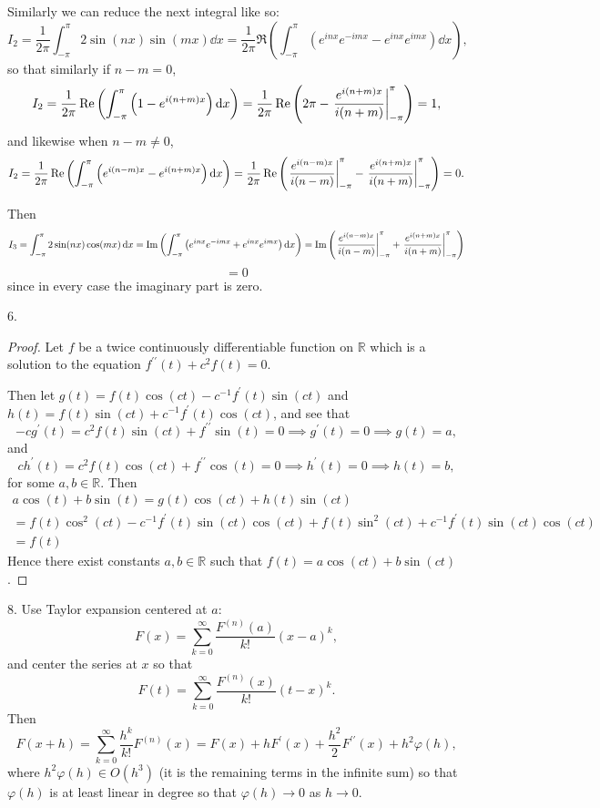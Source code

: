 \documentclass[11pt]{article}
\newcommand{\br}[1]{\left(#1\right)}
\begin{document}
Similarly we can reduce the next integral like so: \[I_2 = \frac{1}{2\pi}\int_{-\pi}^{\pi}2\sin(nx)\sin(mx)\dd{x} = \frac{1}{2\pi}\Re\br{\int_{-\pi}^{\pi}\br{e^{inx}e^{-imx} - e^{inx}e^{imx}}\dd{x}},\] so that similarly if $n-m = 0$, \[I_2 = \frac{1}{2\pi}\Re\br{\int_{-\pi}^{\pi}\br{1 - e^{i(n+m)x}}\dd{x}} = \frac{1}{2\pi}\Re\br{2\pi - \eval{\frac{e^{i(n+m)x}}{i(n+m)}}_{-\pi}^{\pi}} = 1,\] and likewise when $n-m\neq 0$, \[I_2 = \frac{1}{2\pi}\Re\br{\int_{-\pi}^{\pi}\br{e^{i(n-m)x} - e^{i(n+m)x}}\dd{x}} = \frac{1}{2\pi}\Re\br{\eval{\frac{e^{i(n-m)x}}{i(n-m)}}_{-\pi}^{\pi} - \eval{\frac{e^{i(n+m)x}}{i(n+m)}}_{-\pi}^{\pi}} = 0.\] 

Then \[I_3 = \int_{-\pi}^{\pi}2\sin(nx)\cos(mx)\dd{x} = \Im\br{\int_{-\pi}^{\pi}\br{e^{inx}e^{-imx} + e^{inx}e^{imx}}\dd{x}} = \Im\br{\eval{\frac{e^{i(n-m)x}}{i(n-m)}}_{-\pi}^{\pi} + \eval{\frac{e^{i(n+m)x}}{i(n+m)}}_{-\pi}^{\pi}}\] \[= 0\] since in every case the imaginary part is zero.

6. \begin{proof}
  Let $f$ be a twice continuously differentiable function on $\mathbb{R}$ which is a solution to the equation $f^{\prime \prime}(t)+ c^2f(t) = 0$.

  Then let $g(t) = f(t)\cos(ct) - c^{-1}f^{\prime}(t)\sin(ct)$ and $h(t) = f(t)\sin(ct) + c^{-1}f^{\prime}(t)\cos(ct)$, and see that \[-cg^{\prime}(t) = c^2f(t)\sin(ct) + f^{\prime \prime}\sin(t) = 0 \implies g^{\prime}(t) = 0 \implies g(t) = a,\] and \[ch^{\prime}(t) = c^2f(t)\cos(ct) + f^{\prime \prime}\cos(t) = 0 \implies h^{\prime}(t) = 0 \implies h(t) = b,\] for some  $a,b\in \mathbb{R}$. Then \begin{multline*}a\cos(t) + b\sin(t) = g(t)\cos(ct) + h(t)\sin(ct)\\ = f(t)\cos^2(ct) - c^{-1}f^{\prime}(t)\sin(ct)\cos(ct) + f(t)\sin^2(ct) + c^{-1}f^{\prime}(t)\sin(ct)\cos(ct)\\ = f(t)\end{multline*} Hence there exist constants $a,b\in \mathbb{R}$ such that $f(t) = a\cos(ct) + b\sin(ct)$.
\end{proof}

8. Use Taylor expansion centered at $a$: \[F(x) = \sum_{k = 0}^{\infty}\frac{F^{(n)}(a)}{k!}(x-a)^k, \] and center the series at $x$ so that \[F(t) = \sum_{k = 0}^{\infty}\frac{F^{(n)}(x)}{k!}(t-x)^k.\] Then \[F(x+h) = \sum_{k = 0}^{\infty}\frac{h^k}{k!}F^{(n)}(x) = F(x) + hF^{\prime}(x) + \frac{h^2}{2}F^{\prime \prime}(x) + h^2\varphi(h),\] where $h^2\varphi(h)\in O(h^3)$ (it is the remaining terms in the infinite sum) so that $\varphi(h)$ is at least linear in degree so that $\varphi(h)\to 0$ as $h\to 0$.
\end{document}
